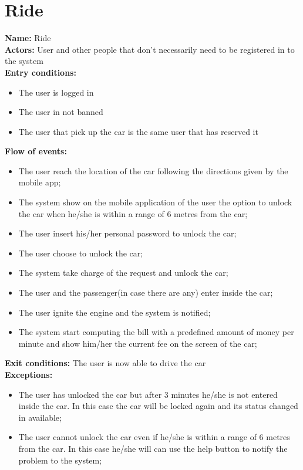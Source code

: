 \section*{Ride}
\textbf{Name:} Ride\\
\textbf{Actors:} User and other people that don't necessarily need to be registered in to the system\\
\textbf{Entry conditions:}
\begin{itemize}
\item The user is logged in
\item The user in not banned
\item The user that pick up the car is the same user that has reserved it
\end{itemize}
\textbf{Flow of events:}
\begin{itemize}
\item The user reach the location of the car following the directions given by the mobile app;
\item The system show on the mobile application of the user the option to unlock the car when he/she is within a range of 6 metres from the car;
\item The user insert his/her personal password to unlock the car;
\item The user choose to unlock the car;
\item The system take charge of the request and unlock the car;
\item The user and the passenger(in case there are any) enter inside the car;
\item The user ignite the engine and the system is notified;
\item The system start computing the bill with a predefined amount of money per minute and show him/her the current fee on the screen of the car;
\end{itemize}
\textbf{Exit conditions:} The user is now able to drive the car \\
\textbf{Exceptions:}
\begin{itemize}
\item The user has unlocked the car but after 3 minutes he/she is not entered inside the car. In this case  the car will be locked again and its status changed in available;
\item The user cannot unlock the car even if he/she is within a range of 6 metres from the car. In this case he/she will can use the help button  to notify the problem to the system;
\end{itemize}




